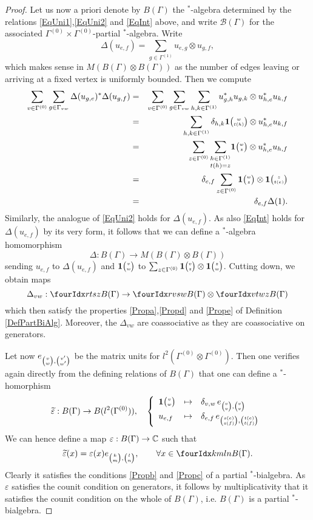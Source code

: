 \begin{proof}
Let us now a priori denote by $B(\Gamma)$ the $^*$-algebra determined by the relations \eqref{EqUni1},\eqref{EqUni2} and \eqref{EqInt} above, and write $\mathscr{B}(\Gamma)$ for the associated $\Gamma^{(0)}\times \Gamma^{(0)}$-partial $^*$-algebra. Write \[\Delta(u_{e,f}) = \sum_{g\in \Gamma^{(1)}} u_{e,g}\otimes u_{g,f},\] which makes sense in $M(B(\Gamma)\otimes B(\Gamma))$ as the number of edges leaving or arriving at a fixed vertex is uniformly bounded. Then we compute \begin{eqnarray*} \sum_{v\in \Gamma^{(0)}}\sum_{g\in \Gamma_{vw}}\Delta(u_{g,e})^*\Delta(u_{g,f}) &=& \sum_{v\in \Gamma^{(0)}}\sum_{g\in \Gamma_{vw}} \sum_{h,k\in \Gamma^{(1)}} u_{g,h}^*u_{g,k}\otimes u_{h,e}^*u_{k,f}\\ &=& \sum_{h,k\in \Gamma^{(1)}} \delta_{h,k} \mathbf{1}{\tiny {\begin{pmatrix} w\\t(h)\end{pmatrix}}}\otimes u_{h,e}^*u_{k,f}\\ &=&  \sum_{z\in \Gamma^{(0)}}\underset{t(h)=z}{\sum_{h\in \Gamma^{(1)}}} \mathbf{1}{\tiny {\begin{pmatrix} w\\z\end{pmatrix}}}\otimes u_{h,e}^*u_{h,f} \\ &=& \delta_{e,f} \sum_{z\in \Gamma^{(0)}} \mathbf{1}{\tiny {\begin{pmatrix} w\\z\end{pmatrix}}}\otimes \mathbf{1}{\tiny {\begin{pmatrix} z\\t(e)\end{pmatrix}}}\\ &=& \delta_{e,f} \Delta(1).\end{eqnarray*}  Similarly, the analogue of \eqref{EqUni2} holds for $\Delta(u_{e,f})$. As also \eqref{EqInt} holds for $\Delta(u_{e,f})$ by its very form, it follows that we can define a $^*$-algebra homomorphism \[\Delta:B(\Gamma)\rightarrow M(B(\Gamma)\otimes B(\Gamma))\] sending $u_{e,f}$ to $\Delta(u_{e,f})$ and $\mathbf{1}{\tiny {\begin{pmatrix} v\\w\end{pmatrix}}}$ to $\sum_{z\in \Gamma^{(0)}} \mathbf{1}{\tiny {\begin{pmatrix} v\\z\end{pmatrix}}}\otimes \mathbf{1}{\tiny {\begin{pmatrix} z\\w\end{pmatrix}}}$. Cutting down, we obtain maps \[\Delta_{vw}:\Gr{B(\Gamma)}{r}{s}{t}{z}\rightarrow \Gr{B(\Gamma)}{r}{s}{v}{w}\otimes \Gr{B(\Gamma)}{v}{w}{t}{z}\] which then satisfy the properties \ref{Propa},\ref{Propd} and \ref{Prope} of Definition \ref{DefPartBiAlg}. Moreover, the $\Delta_{vw}$ are coassociative as they are coassociative on generators.

Let now $e_{{\tiny \begin{pmatrix} v \\ w\end{pmatrix}},{\tiny \begin{pmatrix} v' \\ w'\end{pmatrix}}}$ be the matrix units for $l^2(\Gamma^{(0)}\otimes \Gamma^{(0)})$. Then one verifies again directly from the defining relations of $B(\Gamma)$ that one can define a $^*$-homorphism \[\widetilde{\varepsilon}: B(\Gamma)\rightarrow B(l^2(\Gamma^{(0)})),\quad \left\{\begin{array}{lll} \mathbf{1}{\tiny {\begin{pmatrix} v\\w\end{pmatrix}}}&\mapsto &\delta_{v,w}\, e_{{\tiny \begin{pmatrix} v \\ v\end{pmatrix}},{\tiny \begin{pmatrix} v \\ v\end{pmatrix}}}\\ u_{e,f}&\mapsto& \delta_{e,f}\, e_{{\tiny \begin{pmatrix} s(e) \\ s(f)\end{pmatrix}},{\tiny \begin{pmatrix} t(e) \\ t(f)\end{pmatrix}}}\end{array}\right.\] We can hence define a map $\varepsilon: B(\Gamma)\rightarrow \mathbb{C}$ such that \[\widetilde{\varepsilon}(x) = \varepsilon(x) e_{\Grru{k}{m},\Grru{l}{n}},\qquad  \forall x\in \Gr{B(\Gamma)}{k}{l}{m}{n}.\] Clearly it satisfies the conditions \ref{Propb} and \ref{Propc} of a partial $^*$-bialgebra. As $\varepsilon$ satisfies the counit condition on generators, it follows by multiplicativity that it satisfies the counit condition on the whole of $B(\Gamma)$, i.e. $B(\Gamma)$ is a partial $^*$-bialgebra.


\end{proof}
